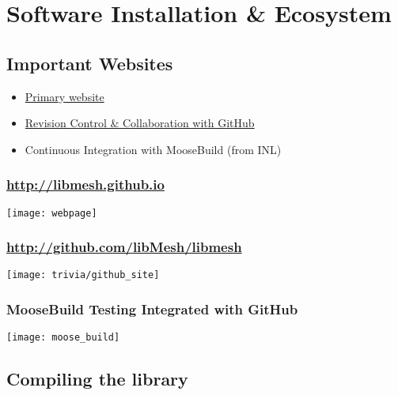 \section{Software Installation \& Ecosystem}
\subsection{Important Websites}
\frame
{
  \Large
  \begin{block}{}
    \begin{itemize}
      \item \href{http://libmesh.sourceforge.net}{Primary website}
      \item \href{http://github.com/libMesh/libmesh}{Revision Control \& Collaboration with GitHub}
      \item Continuous Integration with MooseBuild (from INL)
    \end{itemize}
  \end{block}
}


\frame
{
\frametitle{\url{http://libmesh.github.io}}

\centerline{\texttt{[image: webpage]}}
}


\frame
{
\frametitle{\url{http://github.com/libMesh/libmesh}}

\centerline{\texttt{[image: trivia/github\_site]}}
}


\frame
{
\frametitle{MooseBuild Testing Integrated with GitHub}

\centerline{\texttt{[image: moose\_build]}}
}



\subsection{Compiling the library}
\frame
{
  \Large
  \begin{block}{}
  \end{block}
}


